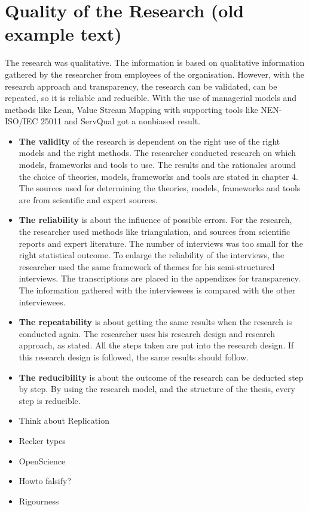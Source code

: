 \section{Quality of the Research (old example text)}
\label{sec:quality-of-the-research}
The research was qualitative. The information is based on qualitative information gathered by the researcher
from employees of the organisation. However, with the research approach and transparency, the research can
be validated, can be repeated, so it is reliable and reducible. With the use of managerial models and methods
like Lean, Value Stream Mapping with supporting tools like NEN-ISO/IEC 25011 and ServQual got a nonbiased
result.
\begin{itemize}
	\item{\textbf{The validity} of the research is dependent on the right use of the right models and the right methods. The researcher conducted research on which models, frameworks and tools to use. The results and the rationales around the choice of theories, models, frameworks and tools are stated in chapter 4. The sources used for determining the theories, models, frameworks and tools are from scientific and expert sources.}
	\item{\textbf{The reliability} is about the influence of possible errors. For the research, the researcher used methods like triangulation, and sources from scientific reports and expert literature. The number of interviews was too small for the right statistical outcome. To enlarge the reliability of the interviews, the researcher used the same framework of themes for his semi-structured interviews. The transcriptions are placed in the appendixes for transparency. The information gathered with the interviewees is compared with the other interviewees.}
	\item{\textbf{The repeatability} is about getting the same results when the research is conducted again. The researcher uses his research design and research approach, as stated. All the steps taken are put into the research design. If this research design is followed, the same results should follow.}
	\item{\textbf{The reducibility} is about the outcome of the research can be deducted step by step. By using the research model, and the structure of the thesis, every step is reducible.}
\end{itemize}

\begin{itemize}
	\item{Think about Replication}
	\item{Recker types}
	\item{OpenScience}
	\item{Howto falsify?}
	\item{Rigourness}
\end{itemize}

